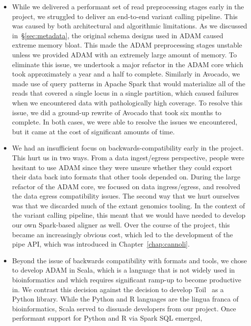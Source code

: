 \documentclass[phd]{ucbthesis}
\begin{document}
\begin{itemize}
\item While we delivered a performant set of read preprocessing stages early in
  the project, we struggled to deliver an end-to-end variant calling pipeline.
  This was caused by both architectural and algorithmic limitations. As we
  discussed in~\S\ref{sec:metadata}, the original schema designs used in ADAM
  caused extreme memory bloat. This made the ADAM preprocessing stages unstable
  unless we provided ADAM with an extremely large amount of memory. To eliminate
  this issue, we undertook a major refactor in the ADAM core which took
  approximately a year and a half to complete. Similarly in Avocado, we made use
  of query patterns in Apache Spark that would materialize all of the reads that
  covered a single locus in a single partition, which caused failures when we
  encountered data with pathologically high coverage. To resolve this issue, we
  did a ground-up rewrite of Avocado that took six months to complete. In both
  cases, we were able to resolve the issues we encountered, but it came at the
  cost of significant amounts of time.
\item We had an insufficient focus on backwards-compatibility early in the
  project. This hurt us in two ways. From a data ingest/egress perspective,
  people were hesitant to use ADAM since they were unsure whether they could
  export their data back into formats that other tools depended on. During the
  large refactor of the ADAM core, we focused on data ingress/egress, and
  resolved the data egress compatibility issues. The second way that we hurt
  ourselves was that we discarded much of the extant genomics tooling. In the
  context of the variant calling pipeline, this meant that we would have needed
  to develop our own Spark-based aligner as well. Over the course of the
  project, this became an increasingly obvious cost, which led to the
  development of the pipe API, which was introduced in
  Chapter~\ref{chap:cannoli}.
\item Beyond the issue of backwards compatibility with formats and tools, we
  chose to develop ADAM in Scala, which is a language that is not widely used
  in bioinformatics and which requires significant ramp-up to become productive
  in. We contrast this decision against the decision to develop
  Toil~\cite{vivian17} as a Python library. While the Python and R languages are
  the lingua franca of bioinformatics, Scala served to dissuade developers from
  our project. Once performant support for Python and R via Spark SQL emerged,

\end{itemize}
\end{document}
